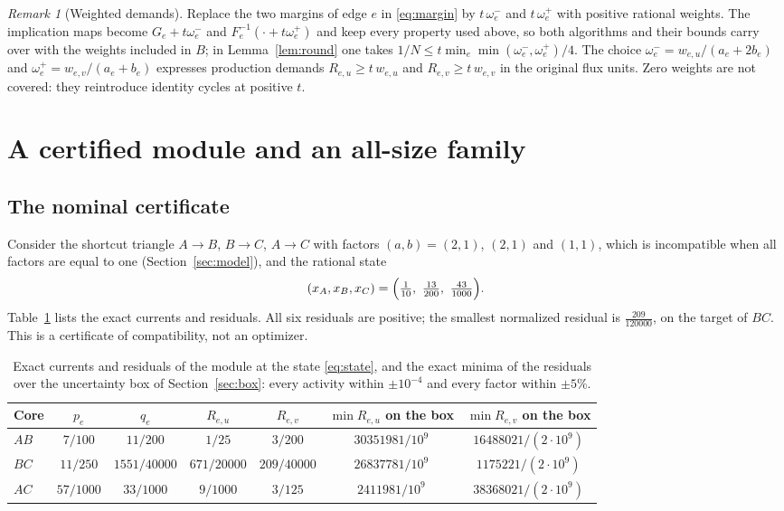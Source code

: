 \documentclass[11pt,a4paper]{article}
\theoremstyle{plain}
\theoremstyle{definition}
\theoremstyle{remark}
\newtheorem{remark}[theorem]{Remark}
\begin{document}
\begin{remark}[Weighted demands]\label{rem:weights}
Replace the two margins of edge $e$ in \eqref{eq:margin} by $t\,\omega_e^-$ and $t\,\omega_e^+$ with positive rational weights. The implication maps become $G_e+t\omega_e^-$ and $F_e^{-1}(\cdot+t\omega_e^+)$ and keep every property used above, so both algorithms and their bounds carry over with the weights included in $B$; in Lemma~\ref{lem:round} one takes $1/N\le t\min_e\min(\omega^-_e,\omega^+_e)/4$. The choice $\omega_e^-=w_{e,u}/(a_e+2b_e)$ and $\omega_e^+=w_{e,v}/(a_e+b_e)$ expresses production demands $R_{e,u}\ge t\,w_{e,u}$ and $R_{e,v}\ge t\,w_{e,v}$ in the original flux units. Zero weights are not covered: they reintroduce identity cycles at positive $t$.
\end{remark}

\section{A certified module and an all-size family}\label{sec:example}

\subsection{The nominal certificate}
Consider the shortcut triangle $A\to B$, $B\to C$, $A\to C$ with factors $(a,b)=(2,1)$, $(2,1)$ and $(1,1)$, which is incompatible when all factors are equal to one (Section~\ref{sec:model}), and the rational state
\begin{equation}\label{eq:state}
  (x_A,x_B,x_C)=\Bigl(\tfrac1{10},\ \tfrac{13}{200},\ \tfrac{43}{1000}\Bigr).
\end{equation}
Table~\ref{tab:triangle} lists the exact currents and residuals. All six residuals are positive; the smallest normalized residual is $\tfrac{209}{120000}$, on the target of $BC$. This is a certificate of compatibility, not an optimizer.

\begin{table}[!ht]
\centering\small
\renewcommand{\arraystretch}{1.25}
\begin{tabular}{@{}lcccccc@{}}
\toprule
Core & $p_e$ & $q_e$ & $R_{e,u}$ & $R_{e,v}$ & $\min R_{e,u}$ on the box & $\min R_{e,v}$ on the box\\
\midrule
$AB$ & $7/100$ & $11/200$ & $1/25$ & $3/200$ & $30351981/10^{9}$ & $16488021/(2\cdot10^{9})$\\
$BC$ & $11/250$ & $1551/40000$ & $671/20000$ & $209/40000$ & $26837781/10^{9}$ & $1175221/(2\cdot10^{9})$\\
$AC$ & $57/1000$ & $33/1000$ & $9/1000$ & $3/125$ & $2411981/10^{9}$ & $38368021/(2\cdot10^{9})$\\
\bottomrule
\end{tabular}
\caption{Exact currents and residuals of the module at the state \eqref{eq:state}, and the exact minima of the residuals over the uncertainty box of Section~\ref{sec:box}: every activity within $\pm10^{-4}$ and every factor within $\pm5\%$.}
\label{tab:triangle}
\end{table}
\end{document}
